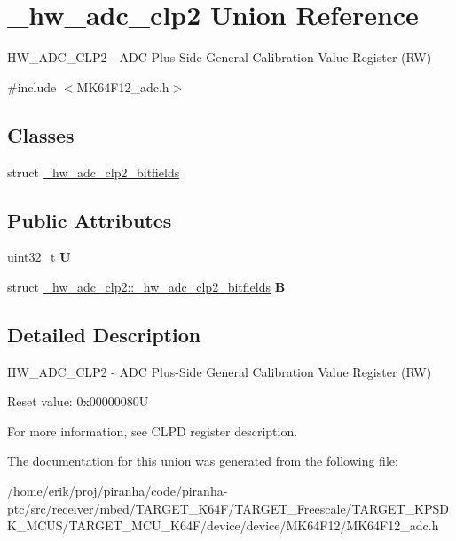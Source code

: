 \hypertarget{union__hw__adc__clp2}{}\section{\+\_\+hw\+\_\+adc\+\_\+clp2 Union Reference}
\label{union__hw__adc__clp2}


H\+W\+\_\+\+A\+D\+C\+\_\+\+C\+L\+P2 -\/ A\+DC Plus-\/\+Side General Calibration Value Register (RW)  




{\ttfamily \#include $<$M\+K64\+F12\+\_\+adc.\+h$>$}

\subsection*{Classes}
\begin{DoxyCompactItemize}
\item 
struct \hyperlink{struct__hw__adc__clp2_1_1__hw__adc__clp2__bitfields}{\+\_\+hw\+\_\+adc\+\_\+clp2\+\_\+bitfields}
\end{DoxyCompactItemize}
\subsection*{Public Attributes}
\begin{DoxyCompactItemize}
\item 
uint32\+\_\+t {\bfseries U}\hypertarget{union__hw__adc__clp2_ab4f284c534ab33ac8f89db0471ff9e4b}{}\label{union__hw__adc__clp2_ab4f284c534ab33ac8f89db0471ff9e4b}

\item 
struct \hyperlink{struct__hw__adc__clp2_1_1__hw__adc__clp2__bitfields}{\+\_\+hw\+\_\+adc\+\_\+clp2\+::\+\_\+hw\+\_\+adc\+\_\+clp2\+\_\+bitfields} {\bfseries B}\hypertarget{union__hw__adc__clp2_a21606f401fac62ec35ee201dd309c112}{}\label{union__hw__adc__clp2_a21606f401fac62ec35ee201dd309c112}

\end{DoxyCompactItemize}


\subsection{Detailed Description}
H\+W\+\_\+\+A\+D\+C\+\_\+\+C\+L\+P2 -\/ A\+DC Plus-\/\+Side General Calibration Value Register (RW) 

Reset value\+: 0x00000080U

For more information, see C\+L\+PD register description. 

The documentation for this union was generated from the following file\+:\begin{DoxyCompactItemize}
\item 
/home/erik/proj/piranha/code/piranha-\/ptc/src/receiver/mbed/\+T\+A\+R\+G\+E\+T\+\_\+\+K64\+F/\+T\+A\+R\+G\+E\+T\+\_\+\+Freescale/\+T\+A\+R\+G\+E\+T\+\_\+\+K\+P\+S\+D\+K\+\_\+\+M\+C\+U\+S/\+T\+A\+R\+G\+E\+T\+\_\+\+M\+C\+U\+\_\+\+K64\+F/device/device/\+M\+K64\+F12/M\+K64\+F12\+\_\+adc.\+h\end{DoxyCompactItemize}

